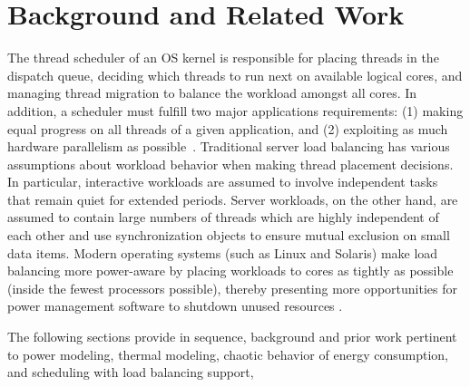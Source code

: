 %
%
\chapter{Background and Related Work}
\label{chp:priorwork}
The thread scheduler of an OS kernel is responsible for placing threads
in the dispatch queue, deciding which threads to run next on available
logical cores, and managing thread migration to balance the workload
amongst all cores.  In addition, a scheduler must fulfill two major
applications requirements: (1) making equal progress on all threads of a
given application, and (2) exploiting as much hardware parallelism as
possible~\cite{Hofmeyr2010}. Traditional server load balancing has
various assumptions about workload behavior when making thread placement
decisions.  In particular, interactive workloads are assumed to involve
independent tasks that remain quiet for extended periods.  Server
workloads, on the other hand, are assumed to contain large numbers of
threads which are highly independent of each other and use
synchronization objects to ensure mutual exclusion on small data items.
Modern operating systems (such as Linux and Solaris) make load balancing
more power-aware by placing workloads to cores as tightly as possible
(inside the fewest processors possible), thereby presenting more
opportunities for power management software to shutdown unused resources
\cite{Sun2009,Sun2009b,Xia2010}.

The following sections provide in sequence, background and prior work
pertinent to power modeling, thermal modeling, chaotic behavior of
energy consumption, and scheduling with load balancing support,


